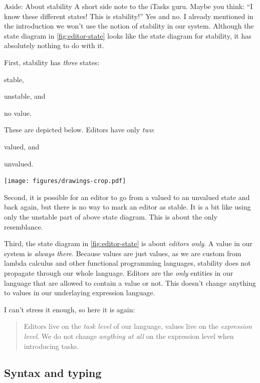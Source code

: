 \begin{margintext}{Aside: About stability}
  A short side note to the iTasks guru.
  Maybe you think: \enquote{I know these different states! This is stability!}
  Yes and no.
  I already mentioned in the introduction we won't use the notion of stability in our system.
  Although the state diagram in \autoref{fig:editor-state} looks like the state diagram for stability,
  it has absolutely nothing to do with it.

  First, stability has \emph{three} states:
  \begin{enumerate*}
    \item stable,
    \item unstable, and
    \item no value.
  \end{enumerate*}
  These are depicted below.
  Editors have only \emph{two}:
  \begin{enumerate*}
    \item valued, and
    \item unvalued.
  \end{enumerate*}

  \texttt{[image: figures/drawings-crop.pdf]}

  Second,
  it is possible for an editor to go from a valued to an unvalued state and back again,
  but there is no way to mark an editor as stable.
  It is a bit like using only the unstable part of above state diagram.
  This is about the only resemblance.

  Third,
  the state diagram in \autoref{fig:editor-state} is about \emph{editors only}.
  A value in our system is \emph{always there}.
  Because values are just values,
  as we are custom from lambda calculus and other functional programming languages,
  stability does not propagate through our whole language.
  Editors are the \emph{only} entities in our language that are allowed to contain a value or not.
  This doesn't change anything to values in our underlaying expression language.

  I can't stress it enough, so here it is again:
  \begin{quote}
  Editors live on the \emph{task level} of our language,
  values live on the \emph{expression level}.
  We do not change \emph{anything at all} on the expression level when introducing tasks.
  \end{quote}
\end{margintext}


\subsection{Syntax and typing}

